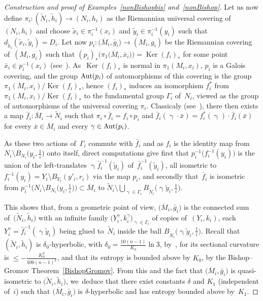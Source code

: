 \documentclass[10pt,a4paper]{amsart}
\numberwithin{equation}{section}
\newcommand{\f}{\rightarrow}
\newcommand{\Ker}{\operatorname{Ker}}
\newcommand{\g}{\operatorname{\gamma}}
\begin{document}
\begin{proof}[Construction and proof of Examples~\ref{nonBishopbis} and~\ref{nonBishop}]
Let us now define $\pi_i \colon (\widetilde N_i, \tilde h_i) \f (N_i, h_i)$ as
the Riemannian universal covering of~$(N_i, h_i)$ and choose $\tilde x_i \in \pi_i^{-1} (x_i)$
and $\tilde y_i \in \pi_i^{-1} (y_i)$ such that $d_{\tilde h_i} (\tilde x_i, \tilde y_i) = D_i $. Let now $ p_i \colon \big(\overline M_i, \bar g_i\big) \f
(M_i, g_i)$ be the Riemannian
covering of~$(M_i, g_i)$ such that $(p_i)_* \big(\pi_1 \big(\overline M_i, \bar x_i\big) \big) = \Ker (f_i)_* $ for some point $\bar x_i \in p_i^{-1} (x_i)$ (see~\cite[Corollary~6.9]{GrH}). As~$\Ker (f_i)_*$ is normal in $\pi_1 (M_i, x_i)$, $p_i$ is a Galois covering, and the group ${\rm Aut} (p_i)$ of automorphisms of this covering is the
group $\pi_1 (M_i, x_i) / \Ker (f_i)_* $, hence $(f_i)_* $ induces an isomorphism $f_i^*$ from $\pi_1 (M_i, x_i) / \Ker (f_i)_*$ to the fundamental
group $\Gamma_i$ of~$N_i$, viewed as the group of automorphisms of the universal covering $\pi_i$.
Classicaly (see~\cite[Theorem~(6.1)]{GrH}), there then exists a map $\bar
f_i \colon \overline M_i \f \widetilde N_i$ such that $\pi_i \circ \bar f_i =
f_i \circ p_i$
and $ \bar f_i (\g\cdot \bar x) = f_i^* (\g) \cdot \bar f_i (\bar x)$ for every $\bar x \in \overline M_i $ and every $\g \in {\rm Aut} (p_i)$.

As these two actions of~$\Gamma_i$ commute with $\bar f_i $ and as $f_i$ is the identity map from $ N_i \setminus B_{N_i} \big(y_i, \frac{1}{i}\big)$ onto itself,
direct computations give first that $p_i^{-1} \big( f_i^{-1} (y_i)\big)$ is the union of the left-translates $ \g \bar f_i^{-1} ( \tilde y_i) $ of~$\bar f_i^{-1} ( \tilde y_i) $, all isometric to $ f_i^{-1} (y_i) = Y_i
\setminus B_{Y_i} (y'_i, r_i) $ via the map $p_i$, and secondly that~$\bar f_i$ is isometric from $p_i^{-1} \big( N_i \setminus B_{N_i} \big(y_i, \frac{1}{i}\big)\big) \subset \overline M_i$ to $\widetilde N_i \setminus \bigcup_{\g \in \Gamma_i} B_{\widetilde N_i} \big(\g \tilde y_i, \frac{1}{i}\big)$.

This shows that, from a geometric point of view, $\big(\overline M_i, \bar g_i\big)$ is the connected sum of~$\big(\widetilde N_i, \tilde h_i\big)$ with an infinite
family $\big(Y_i^\gamma, k_i^\gamma\big)_{\g \in \Gamma_i}$ of copies of~$(Y_i, k_i)$, each $Y_i^\gamma = \bar f_i^{-1} (\g \tilde y_i) $ being glued
to~$\widetilde N_i$ inside
the ball $B_{\widetilde N_i} \big(\g \tilde y_i, \frac{1}{i} \big)$.
Recall that $(\widetilde N_i, \tilde h_i)$ is $\delta_0$-hyperbolic, with
$\delta_0 = \frac{10 (n-1)}{K_0} \ln 3 $, by~\cite[Proposition~1.4.3, p.~12]{CDP},
for its sectional curvature is $\le - \frac{K_0^2}{100 (n-1)^2}$, and that its entropy is bounded above by $K_0$, by the Bishop--Gromov Theorem~\ref{BishopGromov}. From this and the fact that $\big(\overline M_i, \bar g_i\big)$
 is quasi-isometric to $\big(\widetilde N_i, \tilde h_i\big)$, we~deduce that
there exist constants $\delta$ and $K_1$ (independent of~$i$) such that $\big(\overline M_i, \bar g_i\big)$ is $\delta$-hyperbolic and has entropy bounded
above by~$K_1$.


\end{proof}
\end{document}
